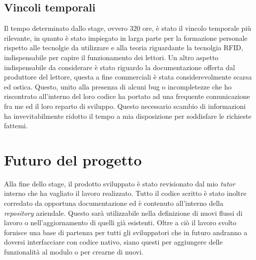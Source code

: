 \subsection{Vincoli temporali}
Il tempo determinato dallo stage, ovvero 320 ore, è stato il vincolo temporale più rilevante, in quanto è stato impiegato in larga parte per la formazione personale rispetto alle tecnolgie da utilizzare
e alla teoria riguardante la tecnolgia RFID, indispensabile per capire il funzionamento dei lettori.
Un altro aspetto indispensabile da considerare è stato riguardo la documentazione offerta dal produttore del lettore, questa a fine commerciali è stata considerevolmente scarsa ed ostica.
Questo, unito alla presenza di alcuni bug o incompletezze che ho riscontrato all'interno del loro codice ha portato ad una frequente comunicazione fra me ed il loro reparto di sviluppo.
Questo necessario scambio di informazioni ha invevitabilmente ridotto il tempo a mia disposizione per soddisfare le richieste fattemi.

\section{Futuro del progetto}
Alla fine dello stage, il prodotto sviluppato è stato revisionato dal mio \emph{tutor} interno che ha vagliato il lavoro realizzato. Tutto il codice scritto è stato inoltre corredato da opportuna
documentazione ed è contenuto all'interno della \emph{repository} aziendale. Questo sarà utilizzabile nella definizione di nuovi flussi di lavoro o nell'aggiornamento di quelli già esistenti.
Oltre a ciò il lavoro svolto fornisce una base di partenza per tutti gli sviluppatori che in futuro andranno a doversi interfacciare con codice nativo, siano questi per aggiungere delle funzionalità
al modulo o per crearne di nuovi.